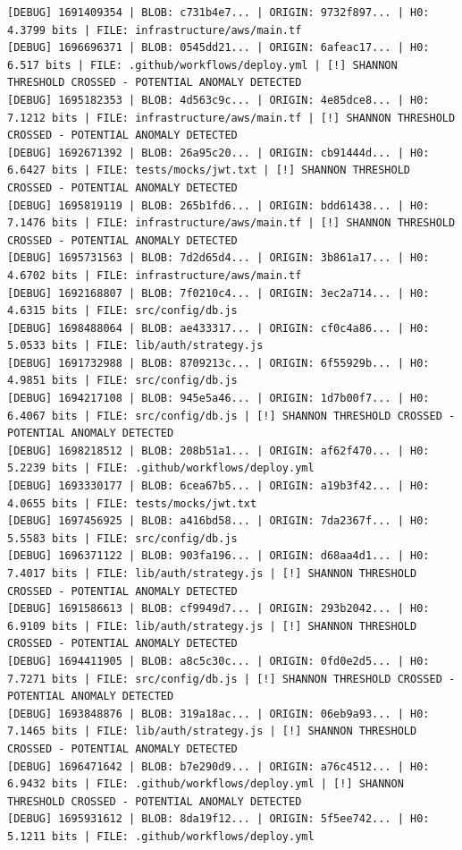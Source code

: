 \documentclass[12pt, a4paper, oneside]{report}
\begin{document}
\begin{lstlisting}[basicstyle=\tiny\ttfamily]
[DEBUG] 1691409354 | BLOB: c731b4e7... | ORIGIN: 9732f897... | H0: 4.3799 bits | FILE: infrastructure/aws/main.tf
[DEBUG] 1696696371 | BLOB: 0545dd21... | ORIGIN: 6afeac17... | H0: 6.517 bits | FILE: .github/workflows/deploy.yml | [!] SHANNON THRESHOLD CROSSED - POTENTIAL ANOMALY DETECTED
[DEBUG] 1695182353 | BLOB: 4d563c9c... | ORIGIN: 4e85dce8... | H0: 7.1212 bits | FILE: infrastructure/aws/main.tf | [!] SHANNON THRESHOLD CROSSED - POTENTIAL ANOMALY DETECTED
[DEBUG] 1692671392 | BLOB: 26a95c20... | ORIGIN: cb91444d... | H0: 6.6427 bits | FILE: tests/mocks/jwt.txt | [!] SHANNON THRESHOLD CROSSED - POTENTIAL ANOMALY DETECTED
[DEBUG] 1695819119 | BLOB: 265b1fd6... | ORIGIN: bdd61438... | H0: 7.1476 bits | FILE: infrastructure/aws/main.tf | [!] SHANNON THRESHOLD CROSSED - POTENTIAL ANOMALY DETECTED
[DEBUG] 1695731563 | BLOB: 7d2d65d4... | ORIGIN: 3b861a17... | H0: 4.6702 bits | FILE: infrastructure/aws/main.tf
[DEBUG] 1692168807 | BLOB: 7f0210c4... | ORIGIN: 3ec2a714... | H0: 4.6315 bits | FILE: src/config/db.js
[DEBUG] 1698488064 | BLOB: ae433317... | ORIGIN: cf0c4a86... | H0: 5.0533 bits | FILE: lib/auth/strategy.js
[DEBUG] 1691732988 | BLOB: 8709213c... | ORIGIN: 6f55929b... | H0: 4.9851 bits | FILE: src/config/db.js
[DEBUG] 1694217108 | BLOB: 945e5a46... | ORIGIN: 1d7b00f7... | H0: 6.4067 bits | FILE: src/config/db.js | [!] SHANNON THRESHOLD CROSSED - POTENTIAL ANOMALY DETECTED
[DEBUG] 1698218512 | BLOB: 208b51a1... | ORIGIN: af62f470... | H0: 5.2239 bits | FILE: .github/workflows/deploy.yml
[DEBUG] 1693330177 | BLOB: 6cea67b5... | ORIGIN: a19b3f42... | H0: 4.0655 bits | FILE: tests/mocks/jwt.txt
[DEBUG] 1697456925 | BLOB: a416bd58... | ORIGIN: 7da2367f... | H0: 5.5583 bits | FILE: src/config/db.js
[DEBUG] 1696371122 | BLOB: 903fa196... | ORIGIN: d68aa4d1... | H0: 7.4017 bits | FILE: lib/auth/strategy.js | [!] SHANNON THRESHOLD CROSSED - POTENTIAL ANOMALY DETECTED
[DEBUG] 1691586613 | BLOB: cf9949d7... | ORIGIN: 293b2042... | H0: 6.9109 bits | FILE: lib/auth/strategy.js | [!] SHANNON THRESHOLD CROSSED - POTENTIAL ANOMALY DETECTED
[DEBUG] 1694411905 | BLOB: a8c5c30c... | ORIGIN: 0fd0e2d5... | H0: 7.7271 bits | FILE: src/config/db.js | [!] SHANNON THRESHOLD CROSSED - POTENTIAL ANOMALY DETECTED
[DEBUG] 1693848876 | BLOB: 319a18ac... | ORIGIN: 06eb9a93... | H0: 7.1465 bits | FILE: lib/auth/strategy.js | [!] SHANNON THRESHOLD CROSSED - POTENTIAL ANOMALY DETECTED
[DEBUG] 1696471642 | BLOB: b7e290d9... | ORIGIN: a76c4512... | H0: 6.9432 bits | FILE: .github/workflows/deploy.yml | [!] SHANNON THRESHOLD CROSSED - POTENTIAL ANOMALY DETECTED
[DEBUG] 1695931612 | BLOB: 8da19f12... | ORIGIN: 5f5ee742... | H0: 5.1211 bits | FILE: .github/workflows/deploy.yml

\end{lstlisting}
\end{document}
